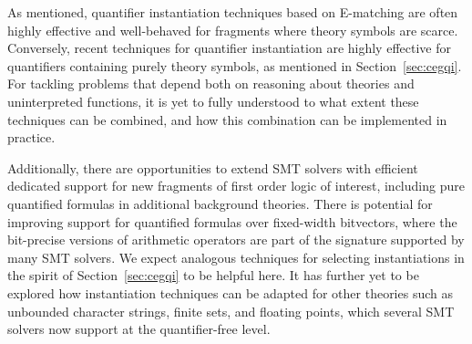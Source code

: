 \documentclass[oribibl]{llncs}
\begin{document}
As mentioned, quantifier instantiation techniques based on E-matching
are often highly effective and well-behaved for fragments where theory symbols are scarce.
Conversely, recent techniques for quantifier instantiation are highly effective for quantifiers containing purely theory symbols,
as mentioned in Section~\ref{sec:cegqi}.
For tackling problems that depend both on reasoning about theories and uninterpreted functions,
it is yet to fully understood to what extent these techniques can be combined,
and how this combination can be implemented in practice.

Additionally, there are opportunities to extend SMT solvers with efficient dedicated support for
new fragments of first order logic of interest, including pure quantified formulas in additional background theories.
There is potential for improving support for quantified formulas over fixed-width bitvectors,
where the bit-precise versions of arithmetic operators are part of the signature supported by many SMT solvers.
We expect analogous techniques for selecting instantiations in the spirit of Section~\ref{sec:cegqi} to be helpful here.
It has further yet to be explored how instantiation techniques can be adapted
for other theories such as unbounded character strings, finite sets, and floating points, 
which several SMT solvers now support at the quantifier-free level.



\end{document}
